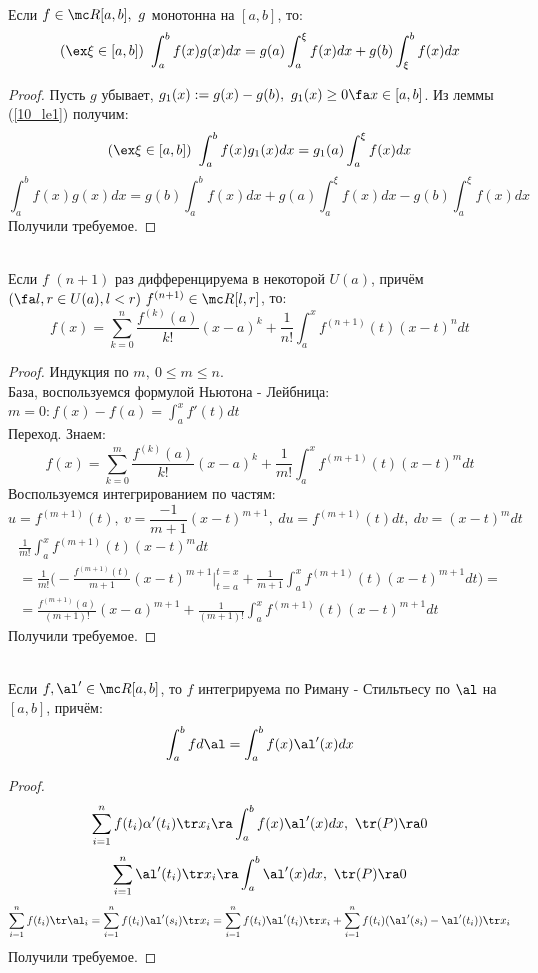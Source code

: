 \begin{theorem}\\
	Если $f\in\mc R[a,b],\ g$ монотонна на $[a,b]$, то:
	\[(\ex\xi\in[a,b])\ \int_a^bf(x)g(x)dx=g(a)\int_a^\xi f(x)dx+g(b)\int_\xi^bf(x)dx\]
\end{theorem}
\begin{proof}
	Пусть $g$ убывает, $g_1(x):=g(x)-g(b),\ g_1(x)\ge0 \fa x\in[a,b]$.
	Из леммы (\ref{10_le1}) получим:
	\[(\ex\xi\in[a,b])\ \int_a^bf(x)g_1(x)dx=g_1(a)\int_a^\xi f(x)dx\]
	\[\int_a^bf(x)g(x)dx=g(b)\int_a^bf(x)dx+g(a)\int_a^\xi f(x)dx-g(b)\int_a^\xi f(x)dx\]
	Получили требуемое.
\end{proof}
\begin{theorem}\\
	Если $f$ $(n+1)$ раз дифференцируема в некоторой $U(a)$, причём $(\fa l,r\in U(a), l<r)\ f^{(n+1)}\in\mc R[l,r]$, то:
	\[f(x)=\sum_{k=0}^n\frac{f^{(k)}(a)}{k!}(x-a)^k+\frac1{n!}\int_a^xf^{(n+1)}(t)(x-t)^ndt\]
\end{theorem}
\begin{proof}
	Индукция по $m,\ 0\le m\le n$.\\
	База, воспользуемся формулой Ньютона - Лейбница: $m=0: f(x)-f(a)=\int_a^xf'(t)dt$\\
	Переход. Знаем:
	\[f(x)=\sum_{k=0}^m\frac{f^{(k)}(a)}{k!}(x-a)^k+\frac1{m!}\int_a^xf^{(m+1)}(t)(x-t)^mdt\]
	Воспользуемся интегрированием по частям:
	\[u=f^{(m+1)}(t),\ v=\frac{-1}{m+1}(x-t)^{m+1},\ du=f^{(m+1)}(t)dt,\ dv=(x-t)^mdt\]
	\begin{multline*}
		\frac1{m!}\int_a^xf^{(m+1)}(t)(x-t)^mdt\\
		=\frac1{m!}\bigg(-\frac{f^{(m+1)}(t)}{m+1}(x-t)^{m+1}\bigg|_{t=a}^{t=x}+\frac1{m+1}\int_a^xf^{(m+1)}(t)(x-t)^{m+1}dt\bigg)=\\
		=\frac{f^{(m+1)}(a)}{(m+1)!}(x-a)^{m+1}+\frac1{(m+1)!}\int_a^xf^{(m+1)}(t)(x-t)^{m+1}dt
	\end{multline*}
	Получили требуемое.
\end{proof}
\begin{note}\\
	Если $f,\al'\in\mc R[a,b]$, то $f$ интегрируема по Риману - Стильтьесу по $\al$ на $[a,b]$, причём:
	\[\int_a^bfd\al=\int_a^bf(x)\al'(x)dx\]
\end{note}
\begin{proof}
	\[\sum_{i=1}^nf(t_i)\alpha'(t_i)\tr x_i\ra\int_a^bf(x)\al'(x)dx,\ \tr(P)\ra0\]
	\[\sum_{i=1}^n\al'(t_i)\tr x_i\ra\int_a^b\al'(x)dx,\ \tr(P)\ra0\]
	\[\sum_{i=1}^nf(t_i)\tr\al_i=\sum_{i=1}^nf(t_i)\al'(s_i)\tr x_i=\sum_{i=1}^nf(t_i)\al'(t_i)\tr x_i+\sum_{i=1}^nf(t_i)(\al'(s_i)-\al'(t_i))\tr x_i\]
	Получили требуемое.
\end{proof}
